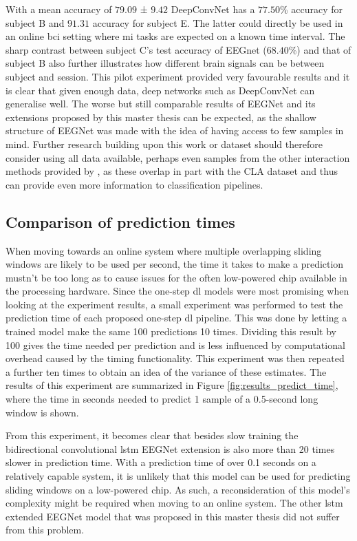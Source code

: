 With a mean accuracy of $79.09$ ± $9.42$ DeepConvNet has a $77.50$\% accuracy for subject B and $91.31$ accuracy for subject E.
The latter could directly be used in an online bci setting where \gls{mi} tasks are expected on a known time interval.
The sharp contrast between subject C's test accuracy of EEGnet ($68.40$\%) and that of subject B also further illustrates how different brain signals can be between subject and session.
This pilot experiment provided very favourable results and it is clear that given enough data, deep networks such as DeepConvNet can generalise well.
The worse but still comparable results of EEGNet and its extensions proposed by this master thesis can be expected, as the shallow structure of EEGNet was made with the idea of having access to few samples in mind.
Further research building upon this work or dataset should therefore consider using all data available, perhaps even samples from the other interaction methods provided by \citet{eeg_data}, as these overlap in part with the CLA dataset and thus can provide even more information to classification pipelines.

\subsection{Comparison of prediction times}
\label{subsec:evaluation_pilot_studies_prediction_time}


When moving towards an online system where multiple overlapping sliding windows are likely to be used per second, the time it takes to make a prediction mustn't be too long as to cause issues for the often low-powered chip available in the processing hardware.
Since the one-step \gls{dl} models were most promising when looking at the experiment results, a small experiment was performed to test the prediction time of each proposed one-step \gls{dl} pipeline.
This was done by letting a trained model make the same 100 predictions 10 times.
Dividing this result by 100 gives the time needed per prediction and is less influenced by computational overhead caused by the timing functionality.
This experiment was then repeated a further ten times to obtain an idea of the variance of these estimates.
The results of this experiment are summarized in Figure \ref{fig:results_predict_time}, where the time in seconds needed to predict 1 sample of a 0.5-second long window is shown.

From this experiment, it becomes clear that besides slow training the bidirectional convolutional \gls{lstm} EEGNet extension is also more than 20 times slower in prediction time.
With a prediction time of over 0.1 seconds on a relatively capable system, it is unlikely that this model can be used for predicting sliding windows on a low-powered chip.
As such, a reconsideration of this model's complexity might be required when moving to an online system.
The other \gls{lstm} extended EEGNet model that was proposed in this master thesis did not suffer from this problem.

